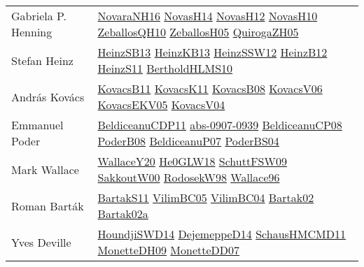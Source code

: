 {\begin{longtable}{p{4cm}p{20cm}}
Gabriela P. Henning & \href{articles/NovaraNH16.pdf}{NovaraNH16}\cite{NovaraNH16} \href{articles/NovasH14.pdf}{NovasH14}\cite{NovasH14} \href{articles/NovasH12.pdf}{NovasH12}\cite{NovasH12} \href{articles/NovasH10.pdf}{NovasH10}\cite{NovasH10} \href{articles/ZeballosQH10.pdf}{ZeballosQH10}\cite{ZeballosQH10} \href{articles/ZeballosH05.pdf}{ZeballosH05}\cite{ZeballosH05} \href{papers/QuirogaZH05.pdf}{QuirogaZH05}\cite{QuirogaZH05} \\
Stefan Heinz & \href{articles/HeinzSB13.pdf}{HeinzSB13}\cite{HeinzSB13} \href{papers/HeinzKB13.pdf}{HeinzKB13}\cite{HeinzKB13} \href{articles/HeinzSSW12.pdf}{HeinzSSW12}\cite{HeinzSSW12} \href{papers/HeinzB12.pdf}{HeinzB12}\cite{HeinzB12} \href{papers/HeinzS11.pdf}{HeinzS11}\cite{HeinzS11} \href{papers/BertholdHLMS10.pdf}{BertholdHLMS10}\cite{BertholdHLMS10} \\
Andr{\'{a}}s Kov{\'{a}}cs & \href{articles/KovacsB11.pdf}{KovacsB11}\cite{KovacsB11} \href{articles/KovacsK11.pdf}{KovacsK11}\cite{KovacsK11} \href{articles/KovacsB08.pdf}{KovacsB08}\cite{KovacsB08} \href{papers/KovacsV06.pdf}{KovacsV06}\cite{KovacsV06} \href{papers/KovacsEKV05.pdf}{KovacsEKV05}\cite{KovacsEKV05} \href{papers/KovacsV04.pdf}{KovacsV04}\cite{KovacsV04} \\
Emmanuel Poder & \href{articles/BeldiceanuCDP11.pdf}{BeldiceanuCDP11}\cite{BeldiceanuCDP11} \href{articles/abs-0907-0939.pdf}{abs-0907-0939}\cite{abs-0907-0939} \href{papers/BeldiceanuCP08.pdf}{BeldiceanuCP08}\cite{BeldiceanuCP08} \href{}{PoderB08}\cite{PoderB08} \href{papers/BeldiceanuP07.pdf}{BeldiceanuP07}\cite{BeldiceanuP07} \href{articles/PoderBS04.pdf}{PoderBS04}\cite{PoderBS04} \\
Mark Wallace & \href{articles/WallaceY20.pdf}{WallaceY20}\cite{WallaceY20} \href{papers/He0GLW18.pdf}{He0GLW18}\cite{He0GLW18} \href{papers/SchuttFSW09.pdf}{SchuttFSW09}\cite{SchuttFSW09} \href{articles/SakkoutW00.pdf}{SakkoutW00}\cite{SakkoutW00} \href{papers/RodosekW98.pdf}{RodosekW98}\cite{RodosekW98} \href{articles/Wallace96.pdf}{Wallace96}\cite{Wallace96} \\
Roman Bart{\'{a}}k & \href{articles/BartakS11.pdf}{BartakS11}\cite{BartakS11} \href{articles/VilimBC05.pdf}{VilimBC05}\cite{VilimBC05} \href{papers/VilimBC04.pdf}{VilimBC04}\cite{VilimBC04} \href{papers/Bartak02.pdf}{Bartak02}\cite{Bartak02} \href{papers/Bartak02a.pdf}{Bartak02a}\cite{Bartak02a} \\
Yves Deville & \href{papers/HoundjiSWD14.pdf}{HoundjiSWD14}\cite{HoundjiSWD14} \href{papers/DejemeppeD14.pdf}{DejemeppeD14}\cite{DejemeppeD14} \href{articles/SchausHMCMD11.pdf}{SchausHMCMD11}\cite{SchausHMCMD11} \href{papers/MonetteDH09.pdf}{MonetteDH09}\cite{MonetteDH09} \href{papers/MonetteDD07.pdf}{MonetteDD07}\cite{MonetteDD07} \\

\end{longtable}}
